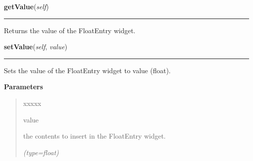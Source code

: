     \label{nMOLDYN:GUI:Widgets:ComboFloatEntry:getValue}

    \vspace{0.5ex}

\hspace{.8\funcindent}\begin{boxedminipage}{\funcwidth}

    \raggedright \textbf{getValue}(\textit{self})

    \vspace{-1.5ex}

    \rule{\textwidth}{0.5\fboxrule}
\setlength{\parskip}{2ex}
    Returns the value of the FloatEntry widget.

\setlength{\parskip}{1ex}
    \end{boxedminipage}

    \label{nMOLDYN:GUI:Widgets:ComboFloatEntry:setValue}

    \vspace{0.5ex}

\hspace{.8\funcindent}\begin{boxedminipage}{\funcwidth}

    \raggedright \textbf{setValue}(\textit{self}, \textit{value})

    \vspace{-1.5ex}

    \rule{\textwidth}{0.5\fboxrule}
\setlength{\parskip}{2ex}
    Sets the value of the FloatEntry widget to {\textbar}value{\textbar} 
    (float).

\setlength{\parskip}{1ex}
      \textbf{Parameters}
      \vspace{-1ex}

      \begin{quote}
        \begin{Ventry}{xxxxx}

          \item[value]

          the contents to insert in the FloatEntry widget.

            {\it (type=float)}

        \end{Ventry}

      \end{quote}

    \end{boxedminipage}


